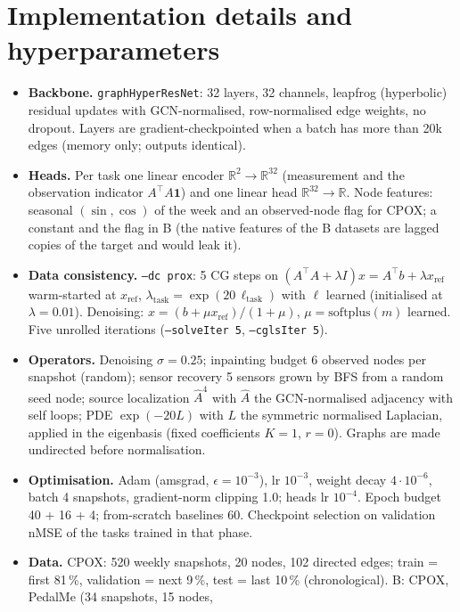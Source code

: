\documentclass{article}
\begin{document}
\section{Implementation details and hyperparameters}
\label{app:impl}
\begin{itemize}\setlength{\itemsep}{1pt}
\item \textbf{Backbone.} \texttt{graphHyperResNet}: 32 layers, 32 channels, leapfrog (hyperbolic) residual
updates with GCN-normalised, row-normalised edge weights, no dropout. Layers are gradient-checkpointed when a
batch has more than 20k edges (memory only; outputs identical).
\item \textbf{Heads.} Per task one linear encoder $\mathbb{R}^{2} \to \mathbb{R}^{32}$ (measurement and the
observation indicator $A^{\top} A \mathbf{1}$) and one linear head $\mathbb{R}^{32} \to \mathbb{R}$. Node
features: seasonal $(\sin, \cos)$ of the week and an observed-node flag for CPOX; a constant and the flag in B
(the native features of the B datasets are lagged copies of the target and would leak it).
\item \textbf{Data consistency.} \texttt{--dc prox}: 5 CG steps on $(A^{\top}A + \lambda I)x = A^{\top}b + \lambda x_{\text{ref}}$
warm-started at $x_{\text{ref}}$, $\lambda_{\text{task}} = \exp(20\,\ell_{\text{task}})$ with $\ell$ learned
(initialised at $\lambda = 0.01$). Denoising: $x = (b + \mu x_{\text{ref}})/(1 + \mu)$, $\mu = \mathrm{softplus}(m)$ learned.
Five unrolled iterations (\texttt{--solveIter 5}, \texttt{--cglsIter 5}).
\item \textbf{Operators.} Denoising $\sigma = 0.25$; inpainting budget 6 observed nodes per snapshot (random);
sensor recovery 5 sensors grown by BFS from a random seed node; source localization $\hat A^{4}$ with
$\hat A$ the GCN-normalised adjacency with self loops; PDE $\exp(-20 L)$ with $L$ the symmetric normalised
Laplacian, applied in the eigenbasis (fixed coefficients $K = 1$, $r = 0$). Graphs are made undirected
before normalisation.
\item \textbf{Optimisation.} Adam (amsgrad, $\epsilon = 10^{-3}$), lr $10^{-3}$, weight decay $4 \cdot 10^{-6}$,
batch 4 snapshots, gradient-norm clipping 1.0; heads lr $10^{-4}$. Epoch budget 40 + 16 + 4; from-scratch
baselines 60. Checkpoint selection on validation nMSE of the tasks trained in that phase.
\item \textbf{Data.} CPOX: 520 weekly snapshots, 20 nodes, 102 directed edges; train = first 81\,\%,
validation = next 9\,\%, test = last 10\,\% (chronological). B: CPOX, PedalMe (34 snapshots, 15 nodes,

\end{itemize}
\end{document}
